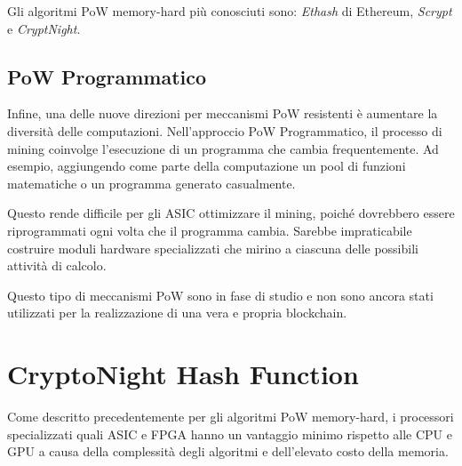 Gli algoritmi PoW memory-hard più conosciuti sono: \textit{Ethash} di Ethereum, \textit{Scrypt} e \textit{CryptNight}. 

    


\subsection{PoW Programmatico}
Infine, una delle nuove direzioni per meccanismi PoW resistenti è aumentare la diversità delle computazioni. 
Nell'approccio PoW Programmatico, il processo di mining coinvolge l'esecuzione di un programma che cambia frequentemente. 
Ad esempio, aggiungendo come parte della computazione un pool di funzioni matematiche o un programma generato casualmente. 

Questo rende difficile per gli ASIC ottimizzare il mining, poiché dovrebbero essere riprogrammati ogni volta che il programma cambia.
Sarebbe impraticabile costruire moduli hardware specializzati che mirino a ciascuna delle possibili attività di calcolo.  

Questo tipo di meccanismi PoW sono in fase di studio e non sono ancora stati utilizzati per la realizzazione di una vera e propria blockchain.


\section{CryptoNight Hash Function}
Come descritto precedentemente per gli algoritmi PoW memory-hard, i processori specializzati quali ASIC e FPGA hanno un vantaggio minimo rispetto alle CPU e GPU a causa della complessità degli algoritmi e dell'elevato costo della memoria. 

